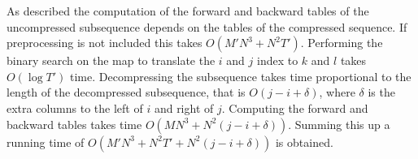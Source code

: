 As described the computation of the forward and backward tables of the
uncompressed subsequence depends on the tables of the compressed sequence. If
preprocessing is not included this takes $O(M' N^3 + N^2 T')$. Performing the
binary search on the map to translate the $i$ and $j$ index to $k$ and $l$
takes $O(\log T')$ time. Decompressing the subsequence takes time proportional
to the length of the decompressed subsequence, that is $O(j - i + \delta)$,
where $\delta$ is the extra columns to the left of $i$ and right of
$j$. Computing the forward and backward tables takes time
$O(M N^3 + N^2 (j - i + \delta))$. Summing this up a running time of $O(M' N^3
+ N^2 T' + N^2 (j - i + \delta))$ is obtained.



